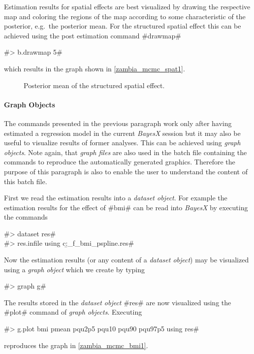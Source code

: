 Estimation results for spatial effects are best visualized by
drawing the respective map and coloring the regions of the map
according to some characteristic of the posterior, e.g.~the
posterior mean. For the structured spatial effect this can be
achieved using the post estimation command #drawmap#

#> b.drawmap 5#

which results in the graph shown in \autoref{zambia_mcmc_spat1}.

\begin{figure}[ht]
\begin{center}
{\it\caption{Posterior mean of the structured spatial
effect.\label{zambia_mcmc_spat1}}}
\end{center}
\end{figure}

\paragraph{Graph Objects}

The commands presented in the previous paragraph work only after
having estimated a regression model in the current {\em BayesX}
session but it may also be useful to visualize results of former
analyses. This can be achieved using {\em graph objects}. Note
again, that {\em graph files} are also used in the batch file
containing the commands to reproduce the automatically generated
graphics. Therefore the purpose of this paragraph is also to
enable the user to understand the content of this batch file.

First we read the estimation results into a {\it dataset object}.
For example the estimation results for the effect of #bmi# can be
read into {\it BayesX} by executing the commands

#> dataset res#\\
#> res.infile using c:\data\b_f_bmi_pspline.res#

Now the estimation results (or any content of a {\it dataset
object}) may be visualized using a {\it graph object} which we
create by typing

#> graph g#

The results stored in the {\em dataset object} #res# are now
visualized using the #plot# command of {\it graph objects}.
Executing

#> g.plot bmi pmean pqu2p5 pqu10 pqu90 pqu97p5 using res#

reproduces the graph in \autoref{zambia_mcmc_bmi1}.


